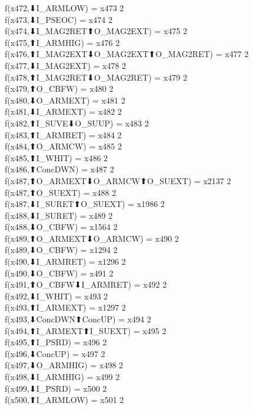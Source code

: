 f(x472,⬇I_ARMLOW) = x473 {2} \\
f(x473,⬇I_PSEOC) = x474 {2} \\
f(x474,⬇I_MAG2RET⬆O_MAG2EXT) = x475 {2} \\
f(x475,⬆I_ARMHIG) = x476 {2} \\
f(x476,⬆I_MAG2EXT⬇O_MAG2EXT⬆O_MAG2RET) = x477 {2} \\
f(x477,⬇I_MAG2EXT) = x478 {2} \\
f(x478,⬆I_MAG2RET⬇O_MAG2RET) = x479 {2} \\
f(x479,⬆O_CBFW) = x480 {2} \\
f(x480,⬇O_ARMEXT) = x481 {2} \\
f(x481,⬇I_ARMEXT) = x482 {2} \\
f(x482,⬆I_SUVE⬇O_SUUP) = x483 {2} \\
f(x483,⬆I_ARMRET) = x484 {2} \\
f(x484,⬆O_ARMCW) = x485 {2} \\
f(x485,⬆I_WHIT) = x486 {2} \\
f(x486,⬆ConcDWN) = x487 {2} \\
f(x487,⬆O_ARMEXT⬇O_ARMCW⬆O_SUEXT) = x2137 {2} \\
f(x487,⬆O_SUEXT) = x488 {2} \\
f(x487,⬇I_SURET⬆O_SUEXT) = x1986 {2} \\
f(x488,⬇I_SURET) = x489 {2} \\
f(x488,⬇O_CBFW) = x1564 {2} \\
f(x489,⬆O_ARMEXT⬇O_ARMCW) = x490 {2} \\
f(x489,⬇O_CBFW) = x1294 {2} \\
f(x490,⬇I_ARMRET) = x1296 {2} \\
f(x490,⬇O_CBFW) = x491 {2} \\
f(x491,⬆O_CBFW⬇I_ARMRET) = x492 {2} \\
f(x492,⬇I_WHIT) = x493 {2} \\
f(x493,⬆I_ARMEXT) = x1297 {2} \\
f(x493,⬇ConcDWN⬆ConcUP) = x494 {2} \\
f(x494,⬆I_ARMEXT⬆I_SUEXT) = x495 {2} \\
f(x495,⬆I_PSRD) = x496 {2} \\
f(x496,⬇ConcUP) = x497 {2} \\
f(x497,⬇O_ARMHIG) = x498 {2} \\
f(x498,⬇I_ARMHIG) = x499 {2} \\
f(x499,⬇I_PSRD) = x500 {2} \\
f(x500,⬆I_ARMLOW) = x501 {2} \\

